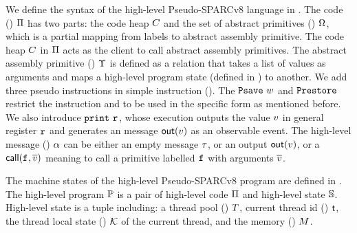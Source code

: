 We define the syntax of the high-level Pseudo-SPARCv8 language
in \Fig{\ref{fig:syntax-of-concur-pseudo-sparc}}.
The code () $\Pi$ has two parts:
the code heap $C$
and the set of abstract primitives () $\Omega$,
which is a partial mapping from labels to
abstract assembly primitive. The code heap $C$ in $\Pi$
acts as the client to
call abstract assembly primitives.
The abstract assembly primitive () $\Upsilon$
is defined as a relation that takes a list of values
as arguments and maps a high-level program state
(defined in \Fig{\ref{fig:machine-state-concur-pseudo-sparc}})
to another.
We add three pseudo instructions in simple instruction ().
The $\texttt{Psave} \ w$
and $\texttt{Prestore}$ restrict the instruction \csave{}
and \crestore{} to be used in the specific form as
mentioned before.
We also introduce $\texttt{print} \ \texttt{r}_{}$,
whose execution outputs the value $v$ in
general register $\texttt{r}_{}$ and
generates an message $\textsf{out}({v})$
as an observable event.
The high-level message ()
$\alpha$ can be either an empty message $\tau$, or an output
$\textsf{out}({v})$, or a $\textsf{call}({\texttt{f}_{}, \overline{v}})$ meaning to
call a primitive labelled $\texttt{f}_{}$ with arguments $\overline{v}$.

The machine states 
of the high-level Pseudo-SPARCv8 program
are defined in \Fig{\ref{fig:machine-state-concur-pseudo-sparc}}.
The high-level program $\mathbb{P}$ is a pair of high-level code
$\Pi$ and high-level state $\mathbb{S}$. High-level
state is a tuple including: 
a thread pool () $T$,
current thread id () $\textsf{t}$, 
the thread local state () $\mathcal{K}$ 
of the current thread, and the memory () $M$.

